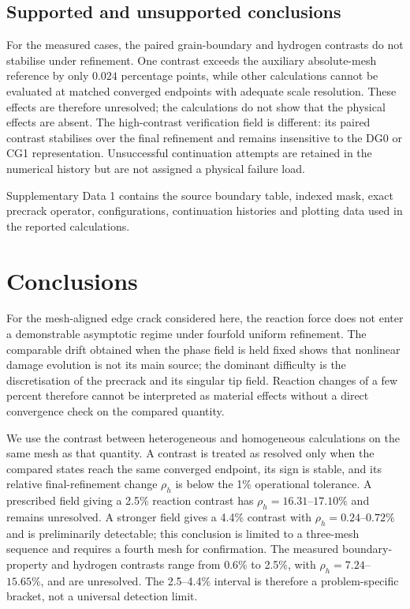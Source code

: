 \documentclass[preprint,12pt]{elsarticle}
\begin{document}
\subsection{Supported and unsupported conclusions}
For the measured cases, the paired grain-boundary and hydrogen contrasts do not
stabilise under refinement. One contrast exceeds the auxiliary absolute-mesh
reference by only \(0.024\) percentage points, while other calculations cannot be
evaluated at matched converged endpoints with adequate scale resolution. These
effects are therefore unresolved; the calculations do not show that the physical
effects are absent. The high-contrast verification field is different: its paired
contrast stabilises over the final refinement and remains insensitive to the DG0
or CG1 representation. Unsuccessful continuation attempts are retained in the
numerical history but are not assigned a physical failure load.

Supplementary Data 1 contains the source boundary table, indexed mask, exact precrack operator, configurations, continuation histories and plotting data used in the reported calculations.
\section{Conclusions}

For the mesh-aligned edge crack considered here, the reaction force does not enter a demonstrable asymptotic regime under fourfold uniform refinement. The comparable drift obtained when the phase field is held fixed shows that nonlinear damage evolution is not its main source; the dominant difficulty is the discretisation of the precrack and its singular tip field. Reaction changes of a few percent therefore cannot be interpreted as material effects without a direct convergence check on the compared quantity.

We use the contrast between heterogeneous and homogeneous calculations on the same mesh as that quantity. A contrast is treated as resolved only when the compared states reach the same converged endpoint, its sign is stable, and its relative final-refinement change $\rho_h$ is below the 1\% operational tolerance. A prescribed field giving a 2.5\% reaction contrast has $\rho_h=16.31$--$17.10\%$ and remains unresolved. A stronger field gives a 4.4\% contrast with $\rho_h=0.24$--$0.72\%$ and is preliminarily detectable; this conclusion is limited to a three-mesh sequence and requires a fourth mesh for confirmation. The measured boundary-property and hydrogen contrasts range from 0.6\% to 2.5\%, with $\rho_h=7.24$--$15.65\%$, and are unresolved. The 2.5--4.4\% interval is therefore a problem-specific bracket, not a universal detection limit.
\end{document}
